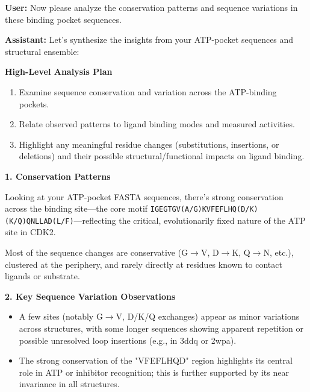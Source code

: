 \documentclass{article}
\begin{document}
\vspace{1.5em}

\begin{userbox}
\textbf{User:} Now please analyze the conservation patterns and sequence variations in these binding pocket sequences.
\end{userbox}

\begin{assistantbox}
\textbf{Assistant:} Let's synthesize the insights from your ATP-pocket sequences and structural ensemble:

\textbf{High-Level Analysis Plan}
\begin{enumerate}[label=\arabic*.]
    \item Examine sequence conservation and variation across the ATP-binding pockets.
    \item Relate observed patterns to ligand binding modes and measured activities.
    \item Highlight any meaningful residue changes (substitutions, insertions, or deletions) and their possible structural/functional impacts on ligand binding.
\end{enumerate}

\textbf{1. Conservation Patterns}

Looking at your ATP-pocket FASTA sequences, there's strong conservation across the binding site—the core motif \texttt{IGEGTGV(A/G)KVFEFLHQ(D/K)(K/Q)QNLLAD(L/F)}—reflecting the critical, evolutionarily fixed nature of the ATP site in CDK2.

Most of the sequence changes are conservative (G$\rightarrow$V, D$\rightarrow$K, Q$\rightarrow$N, etc.), clustered at the periphery, and rarely directly at residues known to contact ligands or substrate.

\textbf{2. Key Sequence Variation Observations}
\begin{itemize}
    \item A few sites (notably G$\rightarrow$V, D/K/Q exchanges) appear as minor variations across structures, with some longer sequences showing apparent repetition or possible unresolved loop insertions (e.g., in 3ddq or 2wpa).
    \item The strong conservation of the "VFEFLHQD" region highlights its central role in ATP or inhibitor recognition; this is further supported by its near invariance in all structures.
\end{itemize}


\end{assistantbox}
\end{document}
